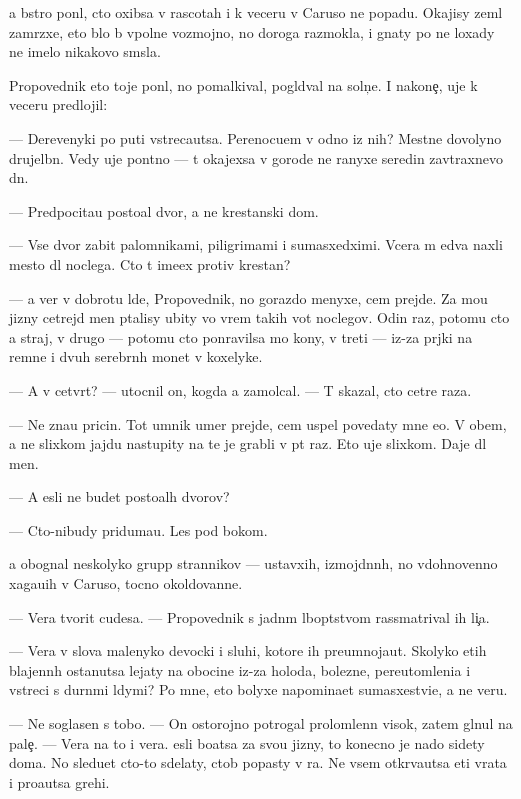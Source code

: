 \documentclass[10pt]{book}
\begin{document}
{\Y}a b{\yi}stro pon{\ia}l, cto oxibsa v rascotah i k veceru v Caruso ne popadu. Okajisy zeml{\ia} zam{\e}rzxe{\y}, eto b{\yi}lo b{\yi} vpolne vozmojno, no doroga razmokla, i gnaty po ne{\y} loxady ne imelo nikakovo sm{\yi}sla.

Propovednik eto toje pon{\ia}l, no pomalkival, pogl{\ia}d{\yi}val na soln{\c}e. I nakone{\c}, uje k veceru predlojil:

— Derevenyki po puti vstreca{\y}utsa. Perenocu{\y}em v odno{\y} iz nih? Mestn{\yi}{\y}e dovolyno drujel{\io}bn{\yi}. Vedy uje pon{\ia}tno — t{\yi} okajexsa v gorode ne ranyxe seredin{\yi} zavtraxnevo dn{\ia}.

— Predpocita{\y}u posto{\y}al{\yi}{\y} dvor, a ne krest{\y}anski{\y} dom.

— Vse dvor{\yi} zabit{\yi} palomnikami, piligrimami i sumasxedximi. Vcera m{\yi} {\y}edva naxli mesto dl{\ia} noclega. Cto t{\yi} ime{\y}ex protiv krest{\y}an?

— {\Y}a ver{\io} v dobrotu l{\io}de{\y}, Propovednik, no gorazdo menyxe, cem prejde. Za mo{\y}u jizny cet{\yi}rejd{\yi} men{\ia} p{\yi}talisy ubity vo vrem{\ia} takih vot noclegov. Odin raz, potomu cto {\y}a straj, v drugo{\y} — potomu cto ponravilsa mo{\y} kony, v treti{\y} — iz-za pr{\ia}jki na remne i dvuh serebr{\ia}n{\yi}h monet v koxelyke.

— A v cetv{\e}rt{\yi}{\y}? — utocnil on, kogda {\y}a zamolcal. — T{\yi} skazal, cto cet{\yi}re raza.

— Ne zna{\y}u pricin{\yi}. Tot umnik umer prejde, cem uspel povedaty mne {\y}e{\y}o. V ob{\x}em, {\y}a ne slixkom jajdu nastupity na te je grabli v p{\ia}t{\yi}{\y} raz. Eto uje slixkom. Daje dl{\ia} men{\ia}.

— A {\y}esli ne budet posto{\y}al{\yi}h dvorov?

— Cto-nibudy priduma{\y}u. Les pod bokom.

{\Y}a obognal neskolyko grupp strannikov — ustavxih, izmojd{\e}nn{\yi}h, no vdohnovenno xaga{\y}u{\x}ih v Caruso, tocno okoldovann{\yi}{\y}e.

— Vera tvorit cudesa. — Propovednik s jadn{\yi}m l{\io}bop{\yi}tstvom rassmatrival ih li{\c}a.

— Vera v slova malenyko{\y} devocki i sluhi, kotor{\yi}{\y}e ih preumnoja{\y}ut. Skolyko etih blajenn{\yi}h ostanutsa lejaty na obocine iz-za holoda, bolezne{\y}, pereutomleni{\y}a i vstreci s durn{\yi}mi l{\io}dymi? Po mne, eto bolyxe napomina{\y}et sumasxestvi{\y}e, a ne veru.

— Ne soglasen s tobo{\y}. — On ostorojno potrogal prolomlenn{\yi}{\y} visok, zatem gl{\ia}nul na pale{\c}. — Vera na to i vera. {\Y}esli bo{\y}atsa za svo{\y}u jizny, to konecno je nado sidety doma. No sledu{\y}et cto-to sdelaty, ctob{\yi} popasty v ra{\y}. Ne vsem otkr{\yi}va{\y}utsa eti vrata i pro{\x}a{\y}utsa grehi.
\end{document}
